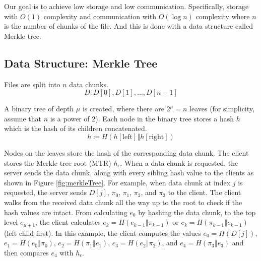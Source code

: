 Our goal is to achieve low storage and low communication. Specifically, storage with $O(1)$ complexity and communication with $O(\log n)$ complexity where $n$ is the number of chunks of the file. And this is done with a data structure called Merkle tree.

\subsection{Data Structure: Merkle Tree}

Files are split into $n$ data chunks.
$$
D: D[0], D[1], ..., D[n-1]
$$

A binary tree of depth $\mu$ is created, where there are $2^\mu = n$ leaves (for simplicity, assume that $n$ is a power of 2). Each node in the binary tree stores a hash $h$ which is the hash of its children concatenated.
$$
h \coloneqq H(h[\mathrm{left}] \mathbin\Vert h[\mathrm{right}])
$$

Nodes on the leaves store the hash of the corresponding data chunk. The client stores the Merkle tree root (MTR) $h_\epsilon$. When a data chunk is requested, the server sends the data chunk, along with every sibling hash value to the clients as shown in Figure \ref{fig:merkleTree}. For example, when data chunk at index $j$ is requested, the server sends $D[j]$, $\pi_0$, $\pi_1$, $\pi_2$, and $\pi_3$ to the client. The client walks from the received data chunk all the way up to the root to check if the hash values are intact. From calculating $e_0$ by hashing the data chunk, to the top level $e_{\mu+1}$, the client calculates $e_k = H(e_{k-1} \mathbin\Vert \pi_{k-1})$ or $e_k = H(\pi_{k-1} \mathbin\Vert e_{k-1})$(left child first). In this example, the client computes the values $e_0 = H(D[j])$, $e_1 = H(e_0 \mathbin\Vert \pi_0)$, $e_2 = H(\pi_1 \mathbin\Vert e_1)$, $e_3 = H(e_2 \mathbin\Vert \pi_2)$, and $e_4 = H(\pi_3 \mathbin\Vert e_3)$ and then compares $e_4$ with $h_\epsilon$.


